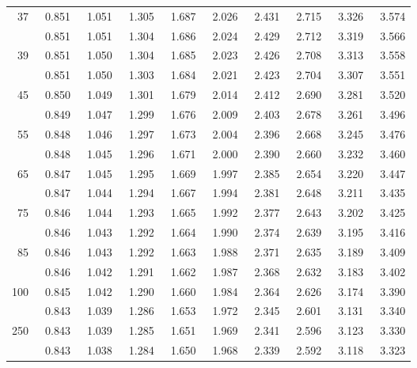 \begin{center}
\begin{tabular}{r | rrr rr rrrr}
        37	&	~0.851	&	~1.051	&	~1.305	&	~1.687	&	~2.026	&	~2.431	&	~2.715	&	~3.326	&	~3.574	\\
\gray   38	&	~0.851	&	~1.051	&	~1.304	&	~1.686	&	~2.024	&	~2.429	&	~2.712	&	~3.319	&	~3.566	\\
        39	&	~0.851	&	~1.050	&	~1.304	&	~1.685	&	~2.023	&	~2.426	&	~2.708	&	~3.313	&	~3.558	\\
\gray   40	&	~0.851	&	~1.050	&	~1.303	&	~1.684	&	~2.021	&	~2.423	&	
~2.704	&	~3.307	&	~3.551	\\
\hline
\hline
        45	&	~0.850	&	~1.049	&	~1.301	&	~1.679	&	~2.014	&	~2.412	&	~2.690	&	~3.281	&	~3.520	\\
\gray   50	&	~0.849	&	~1.047	&	~1.299	&	~1.676	&	~2.009	&	~2.403	&	~2.678	&	~3.261	&	~3.496	\\
        55	&	~0.848	&	~1.046	&	~1.297	&	~1.673	&	~2.004	&	~2.396	&	~2.668	&	~3.245	&	~3.476	\\
\gray   60	&	~0.848	&	~1.045	&	~1.296	&	~1.671	&	~2.000	&	~2.390	&	~2.660	&	~3.232	&	~3.460	\\
        65	&	~0.847	&	~1.045	&	~1.295	&	~1.669	&	~1.997	&	~2.385	&	~2.654	&	~3.220	&	~3.447	\\
\hline
\gray   70	&	~0.847	&	~1.044	&	~1.294	&	~1.667	&	~1.994	&	~2.381	&	~2.648	&	~3.211	&	~3.435	\\
        75	&	~0.846	&	~1.044	&	~1.293	&	~1.665	&	~1.992	&	~2.377	&	~2.643	&	~3.202	&	~3.425	\\
\gray   80	&	~0.846	&	~1.043	&	~1.292	&	~1.664	&	~1.990	&	~2.374	&	~2.639	&	~3.195	&	~3.416	\\
        85	&	~0.846	&	~1.043	&	~1.292	&	~1.663	&	~1.988	&	~2.371	&	~2.635	&	~3.189	&	~3.409	\\
\gray	90	&	~0.846	&	~1.042	&	~1.291	&	~1.662	&	~1.987	&	~2.368	&	~2.632	&	~3.183	&	~3.402	\\
\hline
\hline
100	&	~0.845	&	~1.042	&	~1.290	&	~1.660	&	~1.984	&	~2.364	&	~2.626	&	~3.174	&	~3.390	\\
\gray		200	&	~0.843	&	~1.039	&	~1.286	&	~1.653	&	~1.972	&	~2.345	&	~2.601	&	~3.131	&	~3.340	\\
250	&	~0.843	&	~1.039	&	~1.285	&	~1.651	&	~1.969	&	~2.341	&	~2.596	&	~3.123	&	~3.330	\\
\gray   300	&	~0.843	&	~1.038	&	~1.284	&	~1.650	&	~1.968	&	~2.339	&	~2.592	&	~3.118	&	~3.323	\\

\end{tabular}
\end{center}
